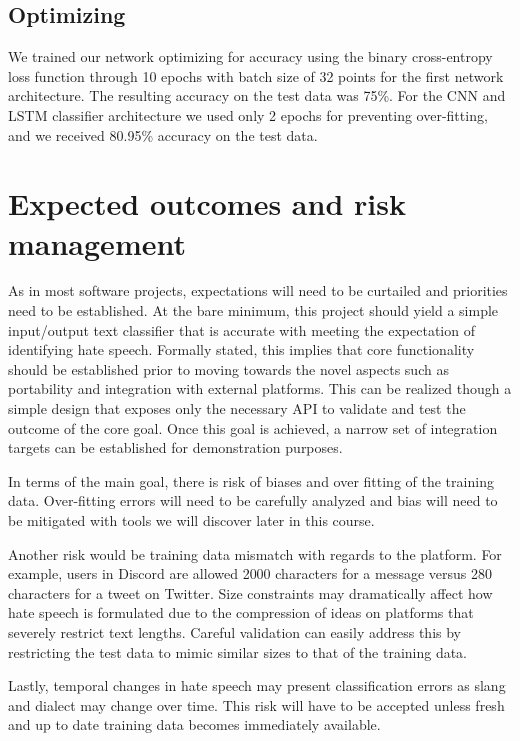 \documentclass[conference]{sig-alternate-05-2015}
\begin{document}
\subsection{Optimizing}
We trained our network optimizing for accuracy using the binary cross-entropy loss function through 10 epochs with batch size of 32 points for the first network architecture. The resulting accuracy on the test data was 75\%. For the CNN and LSTM classifier architecture we used only 2 epochs for preventing over-fitting, and we received 80.95\% accuracy on the test data.


\section{Expected outcomes and risk management}

As in most software projects, expectations will need to be curtailed and priorities need to be established.  At the bare minimum, this project should yield a simple input/output text classifier that is accurate with meeting the expectation of identifying hate speech.  Formally stated, this implies that core functionality should be established prior to moving towards the novel aspects such as portability and integration with external platforms.  This can be realized though a simple design that exposes only the necessary API to validate and test the outcome of the core goal.  Once this goal is achieved, a narrow set of integration targets can be established for demonstration purposes.

In terms of the main goal, there is risk of biases and over fitting of the training data.  Over-fitting errors will need to be carefully analyzed and bias will need to be mitigated with tools we will discover later in this course.

Another risk would be training data mismatch with regards to the platform.  For example, users in Discord are allowed 2000 characters for a message versus 280 characters for a tweet on Twitter.  Size constraints may dramatically affect how hate speech is formulated due to the compression of ideas on platforms that severely restrict text lengths.  Careful validation can easily address this by restricting the test data to mimic similar sizes to that of the training data.

Lastly, temporal changes in hate speech may present classification errors as slang and dialect may change over time.  This risk will have to be accepted unless fresh and up to date training data becomes immediately available.
\end{document}
